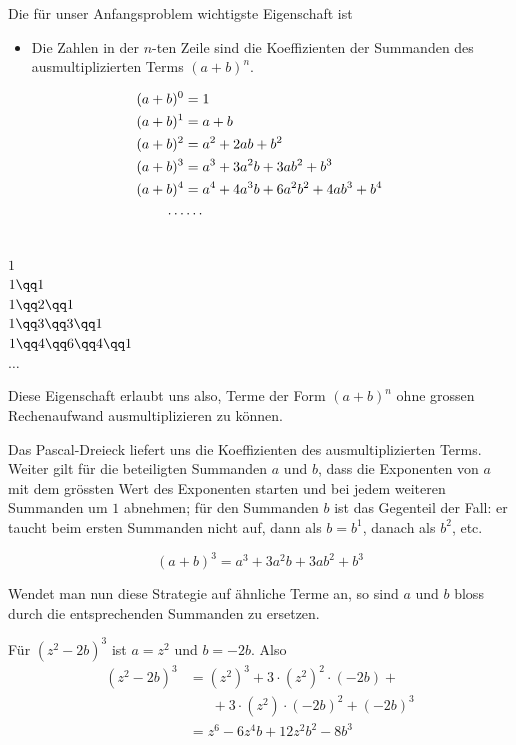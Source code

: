 \documentclass[%
11pt,%
twoside,%
titlepage,%
german,%
]{scrartcl}
\begin{document}
Die f\"ur unser Anfangsproblem wichtigste Eigenschaft ist

\begin{itemize}
\item Die Zahlen in der $n$-ten Zeile sind die Koeffizienten der Summanden des ausmultiplizierten Terms $(a+b)^n$.
\end{itemize}

  \begin{align}
    (a+b)^0 &= 1\notag\\
    (a+b)^1 &= a+b\notag\\
    (a+b)^2 &= a^2+2ab+b^2\notag\\
    (a+b)^3 &= a^3+3a^2b+3ab^2+b^3\notag\\
    (a+b)^4 &= a^4+4a^3b+6a^2b^2+4ab^3+b^4\notag\\
    \dots &\dots\notag
  \end{align}

  \begin{center}
    \ \\[2pt]
    $1$\\[6pt]
    $1\qq1$\\[6pt]
    $1\qq2\qq1$\\[6pt]
    $1\qq3\qq3\qq1$\\[6pt]
    $1\qq4\qq6\qq4\qq1$\\[6pt]
    $\dots$
  \end{center}

Diese Eigenschaft erlaubt uns also, Terme der Form $(a+b)^n$ ohne grossen Rechenaufwand ausmultiplizieren zu k\"onnen.
\begin{bem}
Das Pascal-Dreieck liefert uns die Koeffizienten des ausmultiplizierten Terms. Weiter gilt f\"ur die beteiligten Summanden $a$ und $b$, dass die Exponenten von $a$ mit dem gr\"ossten Wert des Exponenten starten und bei jedem weiteren Summanden um $1$ abnehmen; f\"ur den Summanden $b$ ist das Gegenteil der Fall: er taucht beim ersten Summanden nicht auf, dann als $b=b^1$, danach als $b^2$, etc.
\end{bem}
\begin{bsp}
$$(a+b)^3=a^3+3a^2b+3ab^2+b^3$$
\end{bsp}
Wendet man nun diese Strategie auf \"ahnliche Terme an, so sind $a$ und $b$ bloss durch die entsprechenden Summanden zu ersetzen.
\begin{bsp}
F\"ur $(z^2-2b)^3$ ist $a=z^2$ und $b=-2b$. Also
\begin{align*}
(z^2-2b)^3&=(z^2)^3+3\cdot(z^2)^2\cdot(-2b)+\\
&\phantom{=\;}+3\cdot(z^2)\cdot(-2b)^2+(-2b)^3\\
&=z^6-6z^4b+12z^2b^2-8b^3
\end{align*}
\end{bsp}
\end{document}
